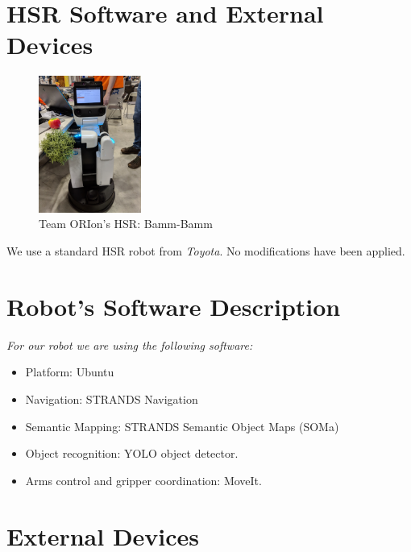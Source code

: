 \section*{HSR Software and External Devices}
\label{sec:annex-DSPL}

\setlength\intextsep{0pt}
\begin{figure}
	\centering
	\includegraphics[width=0.3\textwidth]{images/hsr.jpg}
	\caption{Team ORIon's HSR: Bamm-Bamm}
	\label{fig:eva}
\end{figure}

We use a standard HSR robot from \textit{Toyota}. No modifications have been applied.

\section*{Robot's Software Description}

\textit{For our robot we are using the following software:}

\begin{itemize}
	\item Platform: Ubuntu
	\item Navigation: STRANDS Navigation
	\item Semantic Mapping: STRANDS Semantic Object Maps (SOMa)
	\item Object recognition: YOLO object detector.
	\item Arms control and gripper coordination:  MoveIt.
\end{itemize}

\section*{External Devices}

